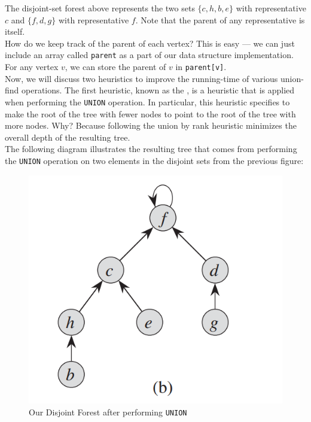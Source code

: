The disjoint-set forest above represents the two sets $\{c, h, b, e\}$ with representative $c$ and $\{f, d, g\}$ with representative $f$. Note that the parent of any representative is itself. \\

How do we keep track of the parent of each vertex? This is easy --- we can just include an array called \verb!parent! as a part of our data structure implementation. For any vertex $v$, we can store the parent of $v$ in \verb!parent[v]!. \\

Now, we will discuss two heuristics to improve the running-time of various union-find operations. The first heuristic, known as the , is a heuristic that is applied when performing the \verb!UNION! operation. In particular, this heuristic specifies to make the root of the tree with fewer nodes to point to the root of the tree with more nodes.  Why? Because following the union by rank heuristic minimizes the overall depth of the resulting tree. \\


The following diagram illustrates the resulting tree that comes from performing the \verb!UNION! operation on two elements in the disjoint sets from the previous figure:
\newpage

\begin{figure}[h]
\centering
\includegraphics[scale=0.4]{media/ufds2}
\caption{Our Disjoint Forest after performing \texttt{UNION}}
\end{figure}

